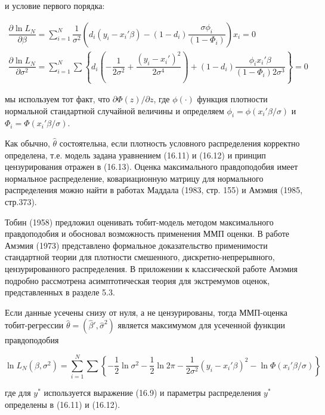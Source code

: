 и условие первого порядка:

\begin{equation}
\begin{array}{l}
\dfrac{\partial \ln L_N}{\partial\beta}=\sum_{i=1}^N\dfrac{1}{\sigma^2}\left(d_i(y_i-x_i'\beta)-(1-d_i)\dfrac{\sigma\phi_i}{(1-\Phi_i)}\right)x_i=0 \\
\dfrac{\partial \ln L_N}{\partial\sigma^2}=\sum_{i=1}^N\sum\left\lbrace d_i \left(-\dfrac{1}{2\sigma^2}+\dfrac{(y_i-x_i')^2}{2\sigma^4}\right)+(1-d_i)\dfrac{\phi_i x_i'\beta}{(1-\Phi_i)2\sigma^3}\right\rbrace=0
\end{array}
\end{equation}


мы используем тот факт, что $\partial\Phi(z)/\partial{z}$, где $\phi(\cdot )$ функция плотности нормальной стандартной случайной величины и определяем $\phi_i=\phi(x_i'\beta/\sigma)$ и $\Phi_i=\Phi(x_i'\beta/\sigma)$.


Как обычно, $\hat{\theta}$ состоятельна, если плотность условного распределения корректно определена, т.е. модель задана уравнением (16.11) и (16.12) и принцип цензурирования отражен в (16.13). Оценка максимального правдоподобия имеет нормальное распределение, ковариационную матрицу для нормального распределения можно найти в работах Маддала (1983, стр. 155) и Амэмия (1985, стр.373).

Тобин (1958) предложил оценивать тобит-модель методом максимального правдоподобия и обосновал возможность применения ММП оценки. В работе Амэмия (1973) представлено формальное доказательство применимости стандартной теории для плотности смешенного, дискретно-непрерывного, цензурированного распределения. В приложении к классической работе Амэмия подробно рассмотрена асимптотическая теория для экстремумов оценок, представленных в разделе 5.3. 

Если данные усечены снизу от нуля, а не цензурированы, тогда ММП-оценка тобит-регрессии $\hat{\theta}=(\hat{\beta}',\hat{\sigma}^2)$ является максимумом для усеченной функции правдоподобия


\begin{equation}
\ln{ L_N(\beta,\sigma^2)}=\sum_{i=1}^N{\sum\left\lbrace -\dfrac{1}{2}\ln{ \sigma^2}-\dfrac{1}{2}{\ln{ 2\pi}}-\dfrac{1}{2\sigma^2}(y_i-x_i'\beta)^2-\ln{ \Phi(x_i'\beta/\sigma)}\right\rbrace }
\end{equation}

где для $y^* $ используется выражение (16.9) и параметры распределения $y^* $ определены в (16.11) и (16.12).

